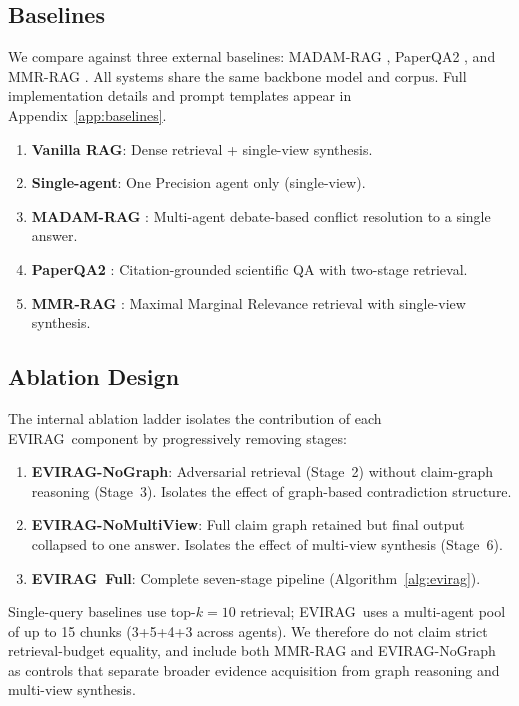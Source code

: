 \documentclass[11pt]{article}
\newcommand{\system}{\textsc{EVIRAG}\xspace}
\begin{document}
\subsection{Baselines}
\label{sec:baselines}

We compare against three external baselines: MADAM-RAG
\citep{wang2025conflicting}, PaperQA2 \citep{lala2023paperqa}, and MMR-RAG
\citep{carbonell1998mmr}.  All systems share the same backbone model and
corpus.  Full implementation details and prompt templates appear in
Appendix~\ref{app:baselines}.

\begin{enumerate}[leftmargin=*,nosep,label=\arabic{enumi}.]
  \item \textbf{Vanilla RAG}: Dense retrieval + single-view synthesis.
  \item \textbf{Single-agent}: One Precision agent only (single-view).
  \item \textbf{MADAM-RAG} \citep{wang2025conflicting}: Multi-agent
    debate-based conflict resolution to a single answer.
  \item \textbf{PaperQA2} \citep{lala2023paperqa}: Citation-grounded
    scientific QA with two-stage retrieval.
  \item \textbf{MMR-RAG} \citep{carbonell1998mmr}: Maximal Marginal
    Relevance retrieval with single-view synthesis.
\end{enumerate}

\subsection{Ablation Design}
\label{sec:ablation}

The internal ablation ladder isolates the contribution of each \system\
component by progressively removing stages:

\begin{enumerate}[leftmargin=*,nosep,label=\arabic{enumi}.]
  \item \textbf{\system-NoGraph}: Adversarial retrieval (Stage~2) without
    claim-graph reasoning (Stage~3).  Isolates the effect of graph-based
    contradiction structure.
  \item \textbf{\system-NoMultiView}: Full claim graph retained but final
    output collapsed to one answer.  Isolates the effect of multi-view
    synthesis (Stage~6).
  \item \textbf{\system\ Full}: Complete seven-stage pipeline (Algorithm~\ref{alg:evirag}).
\end{enumerate}
Single-query baselines use top-$k{=}10$ retrieval; \system\ uses a
multi-agent pool of up to 15 chunks (3+5+4+3 across agents).  We therefore
do not claim strict retrieval-budget equality, and include both MMR-RAG and
\system-NoGraph as controls that separate broader evidence acquisition from
graph reasoning and multi-view synthesis.
\end{document}
